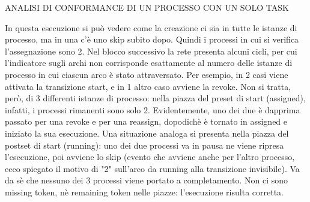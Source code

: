 \documentclass {report}
\begin{document}
                        ANALISI DI CONFORMANCE DI UN PROCESSO CON UN SOLO TASK


In questa esecuzione si può vedere come la creazione ci sia in  tutte le istanze di processo, ma in una c'è uno skip subito dopo.
Quindi i processi in cui si verifica l'assegnazione sono 2.
Nel blocco successivo la rete presenta alcuni cicli, per cui l'indicatore sugli archi non corrisponde esattamente al numero delle istanze di processo in cui ciascun arco è stato attraversato. Per esempio, in 2 casi viene attivata la transizione start, e in 1 altro caso avviene la revoke. Non si tratta, però, di 3 differenti istanze di processo: nella piazza del preset di start (assigned), infatti, i processi rimanenti sono solo 2. Evidentemente, uno dei due è dapprima passato per una revoke e per una reassign, dopodichè è tornato in assigned e iniziato la sua esecuzione.
Una situazione analoga si presenta nella piazza del postset di start (running): uno dei due processi va in pausa ne viene ripresa l'esecuzione, poi avviene lo skip (evento che avviene anche per l'altro processo, ecco spiegato il motivo di "2" sull'arco da running alla transizione invisibile).
Va da sè che nessuno dei 3 processi viene portato a completamento.
Non ci sono missing token, nè remaining token nelle piazze: l'esecuzione risulta corretta.
\end{document}
